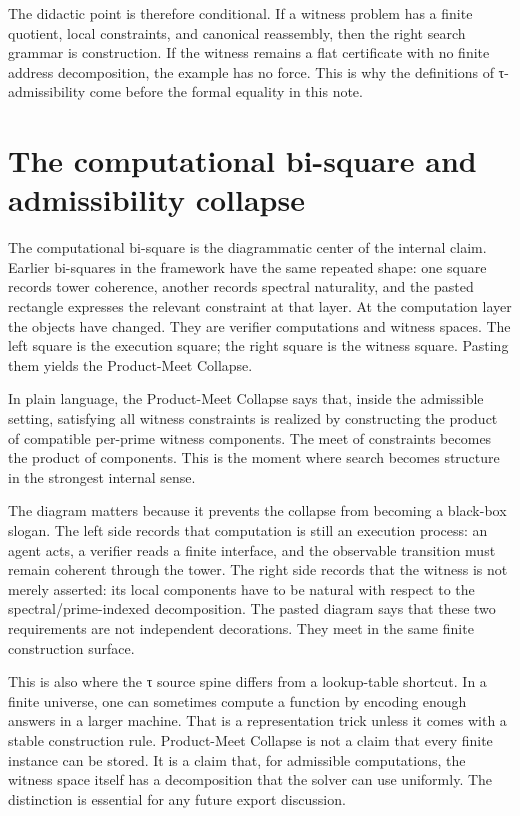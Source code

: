 \documentclass{pantarhei-researchnote}
\begin{document}
The didactic point is therefore conditional. If a witness problem has a
finite quotient, local constraints, and canonical reassembly, then the
right search grammar is construction. If the witness remains a flat
certificate with no finite address decomposition, the example has no
force. This is why the definitions of τ-admissibility come before the
formal equality in this note.

\section{The computational bi-square and admissibility collapse}
\label{sec:bisquare-collapse}

The computational bi-square is the diagrammatic center of the internal
claim. Earlier bi-squares in the framework have the same repeated shape:
one square records tower coherence, another records spectral naturality,
and the pasted rectangle expresses the relevant constraint at that layer.
At the computation layer the objects have changed. They are verifier
computations and witness spaces. The left square is the execution square;
the right square is the witness square. Pasting them yields the
Product-Meet Collapse.

In plain language, the Product-Meet Collapse says that, inside the
admissible setting, satisfying all witness constraints is realized by
constructing the product of compatible per-prime witness components. The
meet of constraints becomes the product of components. This is the moment
where search becomes structure in the strongest internal sense.

The diagram matters because it prevents the collapse from becoming a
black-box slogan. The left side records that computation is still an
execution process: an agent acts, a verifier reads a finite interface,
and the observable transition must remain coherent through the tower. The
right side records that the witness is not merely asserted: its local
components have to be natural with respect to the spectral/prime-indexed
decomposition. The pasted diagram says that these two requirements are
not independent decorations. They meet in the same finite construction
surface.

This is also where the τ source spine differs from a lookup-table
shortcut. In a finite universe, one can sometimes compute a function by
encoding enough answers in a larger machine. That is a representation
trick unless it comes with a stable construction rule. Product-Meet
Collapse is not a claim that every finite instance can be stored. It is a
claim that, for admissible computations, the witness space itself has a
decomposition that the solver can use uniformly. The distinction is
essential for any future export discussion.
\end{document}

